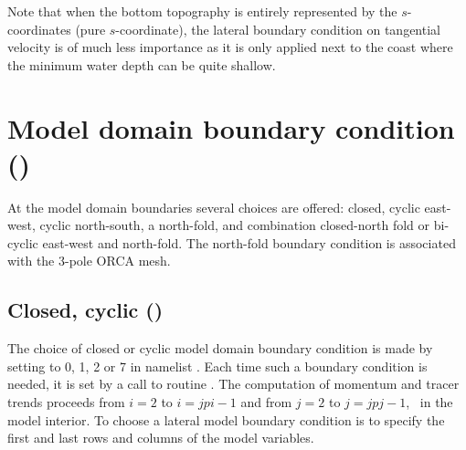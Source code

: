 \documentclass[../main/NEMO_manual]{subfiles}
\begin{document}
Note that when the bottom topography is entirely represented by the $s$-coordinates (pure $s$-coordinate),
the lateral boundary condition on tangential velocity is of much less importance as
it is only applied next to the coast where the minimum water depth can be quite shallow.

\section[Model domain boundary condition (\forcode{jperio})]{Model domain boundary condition (\protect{})}
\label{sec:LBC_jperio}

At the model domain boundaries several choices are offered:
closed, cyclic east-west, cyclic north-south, a north-fold, and combination closed-north fold or
bi-cyclic east-west and north-fold.
The north-fold boundary condition is associated with the 3-pole ORCA mesh.

\subsection[Closed, cyclic (\forcode{=0,1,2,7})]{Closed, cyclic (\protect{})}
\label{subsec:LBC_jperio012}

The choice of closed or cyclic model domain boundary condition is made by
setting  to 0, 1, 2 or 7 in namelist .
Each time such a boundary condition is needed, it is set by a call to routine .
The computation of momentum and tracer trends proceeds from $i=2$ to $i=jpi-1$ and from $j=2$ to $j=jpj-1$,
\ie\ in the model interior.
To choose a lateral model boundary condition is to specify the first and last rows and columns of
the model variables.
\end{document}
